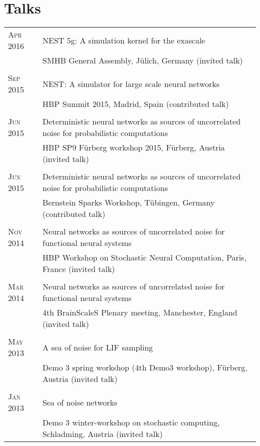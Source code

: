 \documentclass[a4paper,10pt]{article}
\begin{document}
\section{Talks}
\begin{tabular}{>{\hfill}p{1.6cm}|p{}}
  \textsc{Apr} 2016 & NEST 5g: A simulation kernel for the exascale \\
  & \footnotesize SMHB General Assembly, J\"ulich, Germany (invited talk)\\
  \multicolumn{2}{c}{} \\
  \textsc{Sep} 2015 & NEST: A simulator for large scale neural networks\\
  & \footnotesize HBP Summit 2015, Madrid, Spain (contributed talk)\\
  \multicolumn{2}{c}{} \\
  \textsc{Jun} 2015 & Deterministic neural networks as sources of uncorrelated noise for probabilistic computations\\
  & \footnotesize HBP SP9 F\"urberg workshop 2015, F\"urberg, Austria (invited talk)\\
  \multicolumn{2}{c}{} \\
  \textsc{Jun} 2015 & Deterministic neural networks as sources of uncorrelated noise for probabilistic computations \\
  & \footnotesize Bernstein Sparks Workshop, T\"ubingen, Germany (contributed talk)\\
  \multicolumn{2}{c}{} \\
  \textsc{Nov} 2014 & Neural networks as sources of uncorrelated noise for functional neural systems \\
  & \footnotesize HBP Workshop on Stochastic Neural Computation, Paris, France (invited talk)\\
  \multicolumn{2}{c}{} \\
  \textsc{Mar} 2014 & Neural networks as sources of uncorrelated noise for functional neural systems \\
  & \footnotesize 4th BrainScaleS Plenary meeting, Manchester, England  (invited talk)\\
  \multicolumn{2}{c}{} \\
  \textsc{May} 2013 & A sea of noise for LIF sampling \\
  & \footnotesize Demo 3 spring workshop (4th Demo3 workshop), F\"urberg, Austria  (invited talk)\\
  \multicolumn{2}{c}{} \\
  \textsc{Jan} 2013 & Sea of noise networks \\
  & \footnotesize Demo 3 winter-workshop on stochastic computing, Schladming, Austria (invited talk)\\
\end{tabular}
\end{document}
